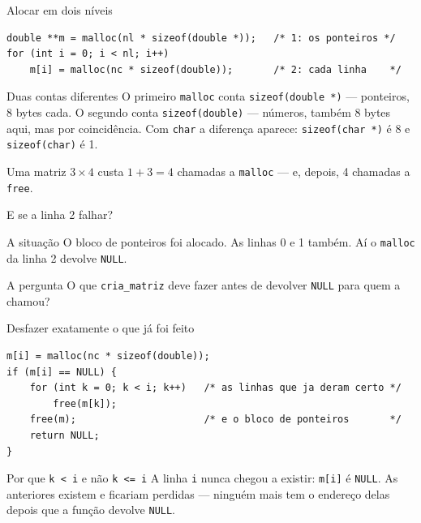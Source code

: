 \documentclass[aspectratio=169]{beamer}
\begin{document}
\begin{frame}[fragile]{Alocar em dois níveis}
\begin{lstlisting}[basicstyle=\ttfamily\scriptsize, numbers=none]
double **m = malloc(nl * sizeof(double *));   /* 1: os ponteiros */
for (int i = 0; i < nl; i++)
    m[i] = malloc(nc * sizeof(double));       /* 2: cada linha    */
\end{lstlisting}
  \begin{block}{Duas contas diferentes}
    O primeiro \texttt{malloc} conta \texttt{sizeof(double *)} --- ponteiros,
    8 bytes cada. O segundo conta \texttt{sizeof(double)} --- números, também 8
    bytes aqui, mas por coincidência. Com \texttt{char} a diferença aparece:
    \texttt{sizeof(char *)} é 8 e \texttt{sizeof(char)} é 1.
  \end{block}
  \begin{exampleblock}{}
    \small Uma matriz $3 \times 4$ custa $1 + 3 = 4$ chamadas a \texttt{malloc}
    --- e, depois, 4 chamadas a \texttt{free}.
  \end{exampleblock}
\end{frame}

\begin{frame}{E se a linha 2 falhar?}
  \begin{block}{A situação}
    O bloco de ponteiros foi alocado. As linhas 0 e 1 também. Aí o
    \texttt{malloc} da linha 2 devolve \texttt{NULL}.
  \end{block}
  \begin{exampleblock}{A pergunta}
    O que \texttt{cria\_matriz} deve fazer antes de devolver \texttt{NULL}
    para quem a chamou?
  \end{exampleblock}
\end{frame}

\begin{frame}[fragile]{Desfazer exatamente o que já foi feito}
\begin{lstlisting}[basicstyle=\ttfamily\scriptsize, numbers=none]
m[i] = malloc(nc * sizeof(double));
if (m[i] == NULL) {
    for (int k = 0; k < i; k++)   /* as linhas que ja deram certo */
        free(m[k]);
    free(m);                      /* e o bloco de ponteiros       */
    return NULL;
}
\end{lstlisting}
  \begin{block}{Por que \texttt{k < i} e não \texttt{k <= i}}
    A linha \texttt{i} nunca chegou a existir: \texttt{m[i]} é \texttt{NULL}.
    As anteriores existem e ficariam perdidas --- ninguém mais tem o endereço
    delas depois que a função devolve \texttt{NULL}.
  \end{block}
\end{frame}
\end{document}
